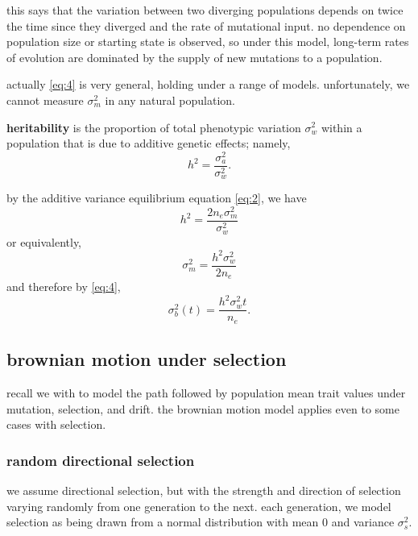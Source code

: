 \documentclass{article}
\newcommand{\advar}{\sigma_{a}^{2}} %
\newcommand{\bvar}{\sigma_{b}^{2}}  %
\newcommand{\mvar}{\sigma_{m}^{2}}  %
\newcommand{\wvar}{\sigma_{w}^{2}}  %
\newcommand{\svar}{\sigma_{s}^{2}}  %
\begin{document}
this says that the variation between two diverging populations depends on twice
the time since they diverged and the rate of mutational input. no dependence on
population size or starting state is observed, so under this model, long-term
rates of evolution are dominated by the supply of new mutations to a population.

actually \eqref{eq:4} is very general, holding under a range of models.
unfortunately, we cannot measure $\mvar$ in any natural population.




\begin{definition}[heritability]
  \textbf{heritability} is the proportion of total phenotypic variation $\wvar$
  within a population that is due to additive genetic effects; namely,
  \begin{equation}
    \label{eq:5}
    h^{2}=\frac{\advar}{\wvar}.
  \end{equation}
\end{definition}

by the additive variance equilibrium equation \eqref{eq:2}, we have
\begin{equation}
  \label{eq:6}
  h^{2}= \frac{2n_{e}\mvar}{\wvar}
\end{equation}
or equivalently,
\begin{equation}
  \label{eq:7}
  \mvar = \frac{h^{2}\wvar}{2n_{e}}
\end{equation}
and therefore by \eqref{eq:4},
\begin{equation}
  \label{eq:8}
  \bvar(t) = \frac{h^{2}\wvar t}{n_{e}}.
\end{equation}


\subsection{brownian motion under selection}
recall we with to model the path followed by population mean trait values under
mutation, selection, and drift. the brownian motion model applies even to some
cases with selection.

\subsubsection{random directional selection}
we assume directional selection, but with the strength and direction of
selection varying randomly from one generation to the next. each generation, we
model selection as being drawn from a normal distribution with mean 0 and
variance $\svar$.
\end{document}
